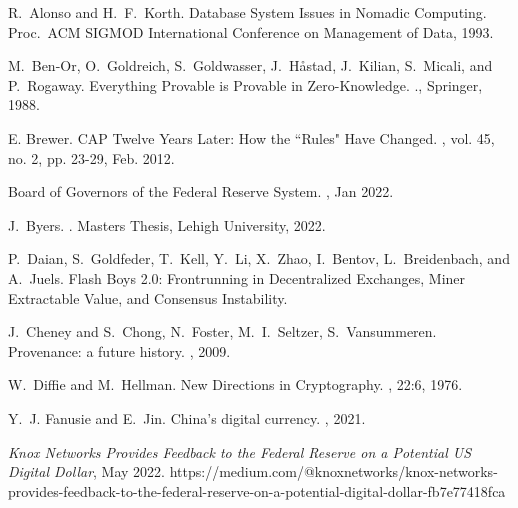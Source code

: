 \documentclass[11pt,dvipdfm]{article}
\begin{document}
\begin{thebibliography}{10}
\itemsep=1pt
\begin{small}

	R.\ Alonso and H.\ F.\ Korth.
	\newblock Database System Issues in Nomadic Computing.
	\newblock Proc.\ ACM SIGMOD International Conference on
               Management of Data, 1993.
               
	M.\ Ben-Or, O.\ Goldreich, S.\ Goldwasser, J.\ Håstad, J.\ Kilian, S.\ Micali, and P.\ Rogaway.
	\newblock Everything Provable is Provable in Zero-Knowledge.
	.,
	Springer,
	1988.
	
	E. Brewer. 
	\newblock CAP Twelve Years Later: How the ``Rules" Have Changed.
	, vol. 45, no. 2, pp. 23-29, Feb. 2012.
	
	Board of Governors of the Federal Reserve System.
	, Jan 2022.

	J.\ Byers.
	.
	\newblock Masters Thesis, Lehigh University, 2022.
	
	P.\ Daian, S.\ Goldfeder, T.\ Kell, Y.\ Li, X.\ Zhao, I.\ Bentov, L.\ Breidenbach, and A.\ Juels.
	\newblock Flash Boys 2.0: Frontrunning in Decentralized Exchanges, Miner Extractable Value, and Consensus Instability.

J.\ Cheney and
               S.\ Chong,
               N.\ Foster,
               M.\ I.\ Seltzer,
               S.\ Vansummeren.  \newblock Provenance: a future history. , 2009.
               
	W.\ Diffie and M.\ Hellman.
	\newblock New Directions in Cryptography.
	, 22:6, 1976.

Y.~J. Fanusie and E.~Jin.
\newblock China's digital currency.
, 2021.

	{\em Knox Networks Provides Feedback to the Federal Reserve on a Potential US Digital Dollar}, May 2022.
	\newblock https://medium.com/@knoxnetworks/knox-networks-provides-feedback-to-the-federal-reserve-on-a-potential-digital-dollar-fb7e77418fca



\end{small}
\end{thebibliography}
\end{document}
